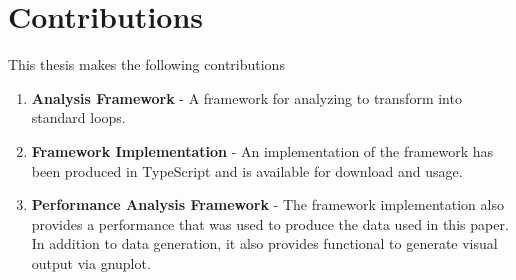 \section{Contributions}
This thesis makes the following contributions
\begin{enumerate}
  \item \textbf{Analysis Framework} - A framework for analyzing \javascript to transform \pipelines into standard  loops.
  \item \textbf{Framework Implementation} - An implementation\cite{fpo16} of the framework has been produced in TypeScript and is available for download and usage.
  \item \textbf{Performance Analysis Framework} - The framework implementation\cite{fpo16} also provides a performance \algorithm that was used to produce the data used in this paper.  In addition to data generation, it also provides functional to generate visual output via gnuplot.   
\end{enumerate}